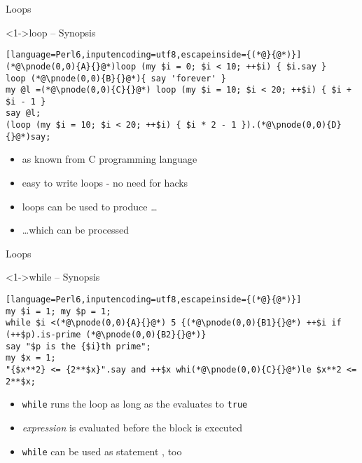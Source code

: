 \begin{frame}[fragile]{Loops}
\begin{block}<1->{loop -- Synopsis}
\small
\begin{lstlisting}[language=Perl6,inputencoding=utf8,escapeinside={(*@}{@*)}]
(*@\pnode(0,0){A}{}@*)loop (my $i = 0; $i < 10; ++$i) { $i.say }
loop (*@\pnode(0,0){B}{}@*){ say 'forever' }
my @l =(*@\pnode(0,0){C}{}@*) loop (my $i = 10; $i < 20; ++$i) { $i + $i - 1 }
say @l;
(loop (my $i = 10; $i < 20; ++$i) { $i * 2 - 1 }).(*@\pnode(0,0){D}{}@*)say;
\end{lstlisting}%
\end{block}

\begin{itemize}
\item<2->  as known from C programming language
\item<3-> easy to write  loops - no need for hacks
\item<4-> loops can be used to produce  \ldots
\item<5-> \ldots which can be processed 
\end{itemize}
\end{frame}

\begin{frame}[fragile]{Loops}
\begin{block}<1->{while -- Synopsis}
\small
\begin{lstlisting}[language=Perl6,inputencoding=utf8,escapeinside={(*@}{@*)}]
my $i = 1; my $p = 1;
while $i <(*@\pnode(0,0){A}{}@*) 5 {(*@\pnode(0,0){B1}{}@*) ++$i if (++$p).is-prime (*@\pnode(0,0){B2}{}@*)}
say "$p is the {$i}th prime";
my $x = 1;
"{$x**2} <= {2**$x}".say and ++$x whi(*@\pnode(0,0){C}{}@*)le $x**2 <= 2**$x;
\end{lstlisting}%
\end{block}

\begin{itemize}
\item<2-> \texttt{while} runs the loop as long as the  evaluates to \texttt{true}
\item<3-> \textit{expression} is evaluated before the block is executed
\item<5-> \texttt{while} can be used as statement , too
\end{itemize}
\end{frame}

